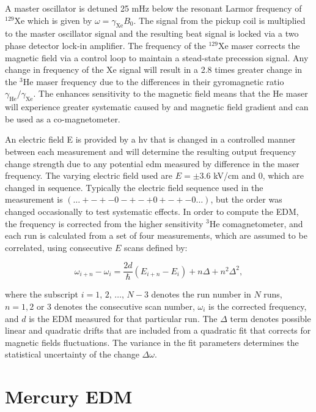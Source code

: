 A master oscillator is detuned 25 mHz below the resonant Larmor frequency of $^{129}$Xe which is given by $\omega = \gamma_{\textrm{Xe}} B_0$. The signal from the pickup coil is multiplied to the master oscillator signal and the resulting beat signal is locked via a two phase detector lock-in amplifier. The frequency of the $^{129}$Xe maser corrects the magnetic field via a control loop to maintain a stead-state precession signal. Any change in frequency of the Xe signal will result in a 2.8 times greater change in the $^3$He maser frequency due to the differences in their gyromagnetic ratio $\gamma_{\textrm{He}}/\gamma_{\textrm{Xe}}$. The enhances sensitivity to the magnetic field means that the He maser will experience greater systematic caused by and magnetic field gradient and can be used as a co-magnetometer.

An electric field E is provided by a \gls{hv} that is changed in a controlled manner between each measurement and will determine the resulting output frequency change strength due to any potential \gls{edm} measured by difference in the maser frequency. The varying electric field used are $E = \pm 3.6$ kV/cm and 0, which are changed in sequence. Typically the electric field sequence used in the measurement is $( \ldots + - + - 0 - + - + 0 + - + - 0 \ldots )$, but the order was changed occasionally to test systematic effects. In order to compute the EDM, the frequency is corrected from the higher sensitivity $^3$He comagnetometer, and each run is calculated from a set of four measurements, which are assumed to be correlated, using consecutive $E$ scans defined by:

\begin{equation}
    \omega_{i+n}-\omega_{i}=\frac{2d}{\hbar}(E_{i+n}-E_i)+n\Delta+n^2\Delta^2,
\end{equation}

where the subscript $i =1, \, 2, \, \ldots, \, N-3$  denotes the run number in $N$ runs,  $n=1,2$ or $3$ denotes the consecutive scan number, $\omega_i$ is the corrected frequency, and $d$ is the EDM measured for that particular run. The $\Delta$ term denotes possible linear and quadratic drifts that are included from a quadratic fit that corrects for magnetic fields fluctuations. The variance in the fit parameters determines the statistical uncertainty of the change $\Delta \omega$.

\section{Mercury EDM}

